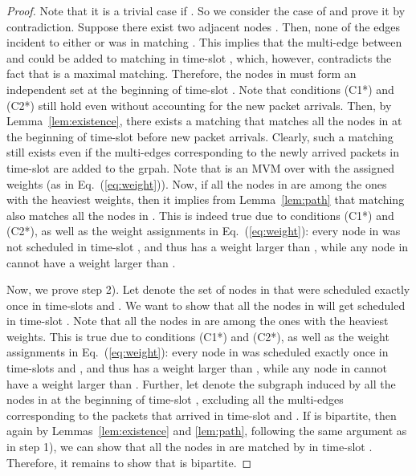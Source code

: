\documentclass[10pt,journal,compsoc]{IEEEtran}
\newcommand{\high}[1]{{\color{black}{#1}}}
\begin{document}
\begin{proof}
Note that it is a trivial case if . So we consider the case of 
 and prove it by contradiction. Suppose there exist two 
adjacent nodes . Then, none of the edges incident to either  or 
 was in matching . This implies that the multi-edge between  and  could 
be added to matching  in time-slot , which, however, contradicts the fact that 
 is a maximal matching. Therefore, the nodes in  must form an 
independent set at the beginning of time-slot . 
\high{Clearly, the subgraph induced by all the nodes in  forms an independent set 
and thus has no edges. In this case, it is trivial that this induced subgraph is bipartite.} 
Note that conditions (C1*) and (C2*) still hold even without accounting for the new packet arrivals. 
Then, by Lemma~\ref{lem:existence}, there exists a matching that matches all the nodes 
in  at the beginning of time-slot  before new packet arrivals. Clearly, 
such a matching still exists even if the multi-edges corresponding to the newly arrived 
packets in time-slot  are added to the grpah. Note that  is an MVM over 
 with the assigned weights (as in Eq.~(\ref{eq:weight})). Now, if all the 
nodes in  are among the ones with the heaviest weights, then it implies 
from Lemma~\ref{lem:path} that matching  also matches all the nodes in 
. This is indeed true due to conditions (C1*) and (C2*), as well as the 
weight assignments in Eq.~(\ref{eq:weight}): every node in  was not 
scheduled in time-slot , and thus has a weight larger than , 
while any node in  cannot have a weight larger than 
.

Now, we prove step 2).
Let  denote the set of nodes in  that were scheduled exactly 
once in time-slots  and . We want to show that all the nodes in  
will get scheduled in time-slot . Note that all the nodes in  are 
among the ones with the heaviest weights. This is true due to conditions (C1*) and (C2*), 
as well as the weight assignments in Eq.~(\ref{eq:weight}): every node in  
was scheduled exactly once in time-slots  and , and thus has a weight larger than 
, while any node in  cannot 
have a weight larger than . Further, 
let  denote the subgraph induced by all the nodes in 
 at the beginning of time-slot , excluding all the multi-edges 
corresponding to the packets that arrived in time-slot  and . 
If  is bipartite, then again by Lemmas~\ref{lem:existence} 
and \ref{lem:path}, following the same argument as in step 1), we can show that all the 
nodes in  are matched by  in time-slot . Therefore, 
it remains to show that  is bipartite. 


\end{proof}
\end{document}
